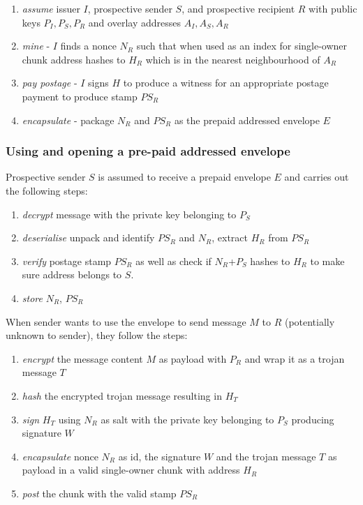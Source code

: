 \begin{enumerate}
\item \emph{assume} issuer $I$, prospective sender $S$, and prospective recipient $R$ with public keys $P_I, P_S, P_R$ and overlay addresses $A_I, A_S, A_R$
\item \emph{mine} - $I$ finds a nonce $N_R$ such that when used as an index for single-owner chunk address hashes to $H_R$ which is in the nearest neighbourhood of $A_R$
\item \emph{pay postage} - $I$ signs $H$ to produce a witness for an appropriate postage payment to produce stamp $PS_R$ 
\item \emph{encapsulate} - package $N_R$ and $PS_R$ as the prepaid addressed envelope $E$ 
\end{enumerate}

\subsubsection{Using and opening a pre-paid addressed envelope}

Prospective sender $S$ is assumed to receive a prepaid envelope $E$ and carries out  the following steps:
\begin{enumerate}
    \item \emph{decrypt} message with the private key belonging to $P_S$
    \item \emph{deserialise} unpack and identify $PS_R$ and $N_R$, extract $H_R$ from $PS_R$
    \item \emph{verify} postage stamp $PS_R$ as well as check if $N_R$+$P_S$ hashes to $H_R$ to make sure address belongs to  $S$.
    \item \emph{store} $N_R$, $PS_R$ 
\end{enumerate}

When sender wants to use the envelope to send message $M$ to $R$ (potentially unknown to sender), they 
follow the steps:

\begin{enumerate}
        \item \emph{encrypt} the message content $M$ as payload with $P_R$ and wrap it as a trojan message $T$
        \item \emph{hash} the encrypted trojan message resulting in $H_T$
        \item \emph{sign} $H_T$ using $N_R$ as salt with the private key belonging to $P_S$ producing signature $W$
        \item \emph{encapsulate} nonce $N_R$ as id, the signature $W$ and the trojan message $T$ as payload in a valid single-owner chunk with address $H_R$
        \item \emph{post} the chunk with the valid stamp $PS_R$
\end{enumerate}


